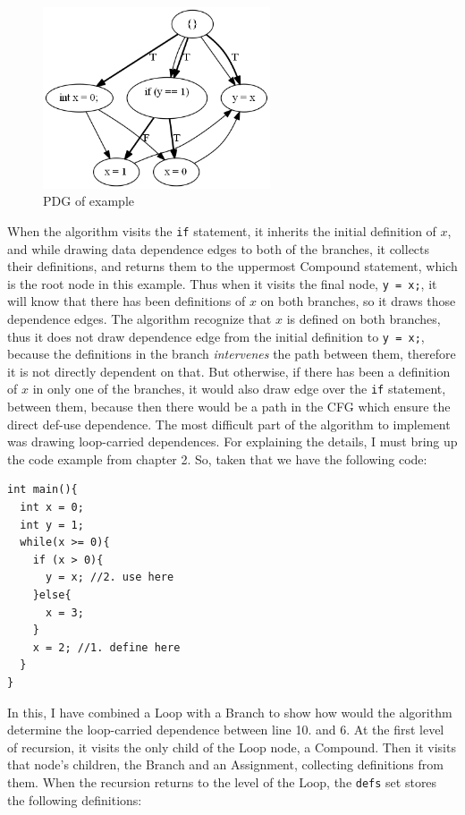 \documentclass[oneside,12pt,a4paper]{book}
\begin{document}
\begin{figure}[h]
\centering
\includegraphics[width=0.6\textwidth]{if_test}
\caption{PDG of example}
\label{fig:if_test}
\end{figure}
When the algorithm visits the \texttt{if} statement, it inherits the initial definition of $x$, and while drawing data dependence edges to both of the branches, it collects their definitions, and returns them to the uppermost Compound statement, which is the root node in this example. Thus when it visits the final node, \texttt{y = x;}, it will know that there has been definitions of $x$ on both branches, so it draws those dependence edges. The algorithm recognize that $x$ is defined on both branches, thus it does not draw dependence edge from the initial definition to \texttt{y = x;}, because the definitions in the branch \textit{intervenes} the path between them, therefore it is not directly dependent on that. But otherwise, if there has been a definition of $x$ in only one of the branches, it would also draw edge over the \texttt{if} statement, between them, because then there would be a path in the CFG which ensure the direct def-use dependence. 
%
The most difficult part of the algorithm to implement was drawing loop-carried dependences. For explaining the details, I must bring up the code example from chapter 2. So, taken that we have the following code:
\clearpage
\begin{lstlisting}
int main(){
  int x = 0;
  int y = 1;
  while(x >= 0){
    if (x > 0){
      y = x; //2. use here 
    }else{
      x = 3;
    }
    x = 2; //1. define here
  }
}
\end{lstlisting}

In this, I have combined a Loop with a Branch to show how would the algorithm determine the loop-carried dependence between line 10. and 6. At the first level of recursion, it visits the only child of the Loop node, a Compound. Then it visits that node's children, the Branch and an Assignment, collecting definitions from them. When the recursion returns to the level of the Loop, the \texttt{defs} set stores the following definitions:
\end{document}
